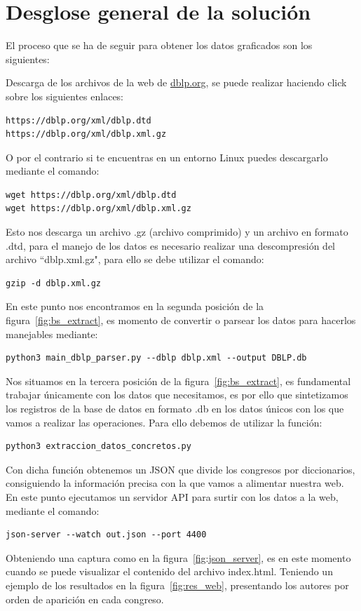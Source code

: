 \documentclass[a4paper, 12pt]{book}
\begin{document}

\section{Desglose general de la solución} 

El proceso que se ha de seguir para obtener los datos graficados son los siguientes:

Descarga de los archivos de la web de \url{dblp.org}, se puede realizar haciendo click sobre los siguientes enlaces:
\begin{verbatim}    
https://dblp.org/xml/dblp.dtd
https://dblp.org/xml/dblp.xml.gz
\end{verbatim}
O por el contrario si te encuentras en un entorno Linux puedes descargarlo mediante el comando:
\begin{verbatim}
wget https://dblp.org/xml/dblp.dtd
wget https://dblp.org/xml/dblp.xml.gz
\end{verbatim}
Esto nos descarga un archivo .gz (archivo comprimido) y un archivo en formato .dtd, para el manejo de los datos es necesario realizar una descompresión del archivo ``dblp.xml.gz", para ello se debe utilizar el comando:
\begin{verbatim}
gzip -d dblp.xml.gz
\end{verbatim}
En este punto nos encontramos en la segunda posición de la figura~\ref{fig:bs_extract}, es momento de convertir o parsear los datos para hacerlos manejables mediante:
\begin{verbatim}
python3 main_dblp_parser.py --dblp dblp.xml --output DBLP.db
\end{verbatim}
Nos situamos en la tercera posición de la figura~\ref{fig:bs_extract}, es fundamental trabajar únicamente con los datos que necesitamos, es por ello que sintetizamos los registros de la base de datos en formato .db en los datos únicos con los que vamos a realizar las operaciones. Para ello debemos de utilizar la función:

\begin{verbatim}
python3 extraccion_datos_concretos.py
\end{verbatim}
Con dicha función obtenemos un JSON que divide los congresos por diccionarios, consiguiendo la información precisa con la que vamos a alimentar nuestra web. En este punto ejecutamos un servidor API para surtir con los datos a la web, mediante el comando:
\begin{verbatim}
json-server --watch out.json --port 4400
\end{verbatim}
Obteniendo una captura como en la figura~\ref{fig:json_server}, es en este momento cuando se puede visualizar el contenido del archivo index.html. Teniendo un ejemplo de los resultados en la figura~\ref{fig:res_web}, presentando los autores por orden de aparición en cada congreso.
\end{document}
